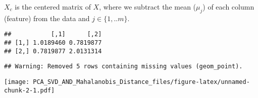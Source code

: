 \documentclass[]{article}
\newenvironment{Shaded}{\begin{snugshade}}{\end{snugshade}}
\newcommand{\KeywordTok}[1]{\textcolor[rgb]{0.13,0.29,0.53}{\textbf{{#1}}}}
\newcommand{\DataTypeTok}[1]{\textcolor[rgb]{0.13,0.29,0.53}{{#1}}}
\newcommand{\DecValTok}[1]{\textcolor[rgb]{0.00,0.00,0.81}{{#1}}}
\newcommand{\StringTok}[1]{\textcolor[rgb]{0.31,0.60,0.02}{{#1}}}
\newcommand{\NormalTok}[1]{{#1}}
\begin{document}
\(X_c\) is the centered matrix of \(X\), where we subtract the mean
(\(\mu_j\)) of each column (feature) from the data and
\(j \in \{1,..m\}\).

\begin{Shaded}
\end{Shaded}

\begin{verbatim}
##           [,1]      [,2]
## [1,] 1.0189460 0.7819877
## [2,] 0.7819877 2.0131314
\end{verbatim}

\begin{Shaded}
\end{Shaded}

\begin{verbatim}
## Warning: Removed 5 rows containing missing values (geom_point).
\end{verbatim}

\texttt{[image: PCA\_SVD\_AND\_Mahalanobis\_Distance\_files/figure-latex/unnamed-chunk-2-1.pdf]}

\begin{Shaded}
\end{Shaded}
\end{document}
